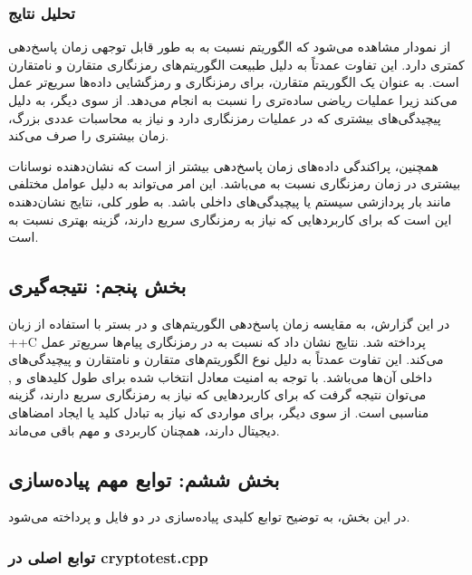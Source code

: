 \documentclass{report}
\begin{document}
\subsubsection*{تحلیل نتایج}
از نمودار  مشاهده می‌شود که الگوریتم  نسبت به  به طور قابل توجهی زمان پاسخ‌دهی کمتری دارد. این تفاوت عمدتاً به دلیل طبیعت الگوریتم‌های رمزنگاری متقارن و نامتقارن است.  به عنوان یک الگوریتم متقارن، برای رمزنگاری و رمزگشایی داده‌ها سریع‌تر عمل می‌کند زیرا عملیات ریاضی ساده‌تری را نسبت به  انجام می‌دهد. از سوی دیگر،  به دلیل پیچیدگی‌های بیشتری که در عملیات رمزنگاری دارد و نیاز به محاسبات عددی بزرگ، زمان بیشتری را صرف می‌کند.

همچنین، پراکندگی داده‌های زمان پاسخ‌دهی  بیشتر از  است که نشان‌دهنده نوسانات بیشتری در زمان رمزنگاری  نسبت به  می‌باشد. این امر می‌تواند به دلیل عوامل مختلفی مانند بار پردازشی سیستم یا پیچیدگی‌های داخلی  باشد. به طور کلی، نتایج نشان‌دهنده این است که برای کاربردهایی که نیاز به رمزنگاری سریع دارند،  گزینه بهتری نسبت به  است.

\subsection*{بخش پنجم: نتیجه‌گیری}

در این گزارش، به مقایسه زمان پاسخ‌دهی الگوریتم‌های  و  در بستر  با استفاده از زبان ++C پرداخته شد. نتایج نشان داد که  نسبت به  در رمزنگاری پیام‌ها سریع‌تر عمل می‌کند. این تفاوت عمدتاً به دلیل نوع الگوریتم‌های متقارن و نامتقارن و پیچیدگی‌های داخلی آن‌ها می‌باشد. با توجه به امنیت معادل انتخاب شده برای طول کلیدهای  و , می‌توان نتیجه گرفت که برای کاربردهایی که نیاز به رمزنگاری سریع دارند،  گزینه مناسبی است. از سوی دیگر،  برای مواردی که نیاز به تبادل کلید یا ایجاد امضاهای دیجیتال دارند، همچنان کاربردی و مهم باقی می‌ماند.

\subsection*{بخش ششم: توابع مهم پیاده‌سازی}

در این بخش، به توضیح توابع کلیدی پیاده‌سازی در دو فایل  و  پرداخته می‌شود.

\subsubsection*{توابع اصلی در cryptotest.cpp}
\end{document}
